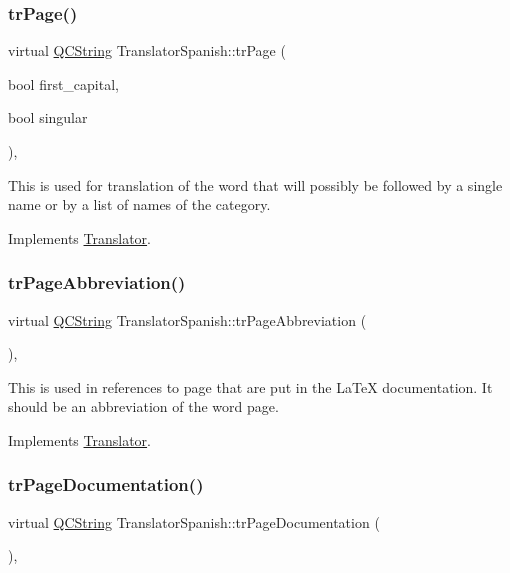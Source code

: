 \subsubsection{\texorpdfstring{trPage()}{trPage()}}
{\footnotesize\ttfamily virtual \mbox{\hyperlink{class_q_c_string}{Q\+C\+String}} Translator\+Spanish\+::tr\+Page (\begin{DoxyParamCaption}\item[{bool}]{first\+\_\+capital,  }\item[{bool}]{singular }\end{DoxyParamCaption})\hspace{0.3cm}{\ttfamily [inline]}, {\ttfamily [virtual]}}

This is used for translation of the word that will possibly be followed by a single name or by a list of names of the category. 

Implements \mbox{\hyperlink{class_translator}{Translator}}.

\mbox{\label{class_translator_spanish_a6fd6a81ee5dab8fdb52086d32010f0ac}} 
\subsubsection{\texorpdfstring{trPageAbbreviation()}{trPageAbbreviation()}}
{\footnotesize\ttfamily virtual \mbox{\hyperlink{class_q_c_string}{Q\+C\+String}} Translator\+Spanish\+::tr\+Page\+Abbreviation (\begin{DoxyParamCaption}{ }\end{DoxyParamCaption})\hspace{0.3cm}{\ttfamily [inline]}, {\ttfamily [virtual]}}

This is used in references to page that are put in the La\+TeX documentation. It should be an abbreviation of the word page. 

Implements \mbox{\hyperlink{class_translator}{Translator}}.

\mbox{\label{class_translator_spanish_af50833c19a7d9fb83375a85fb70309b8}} 
\subsubsection{\texorpdfstring{trPageDocumentation()}{trPageDocumentation()}}
{\footnotesize\ttfamily virtual \mbox{\hyperlink{class_q_c_string}{Q\+C\+String}} Translator\+Spanish\+::tr\+Page\+Documentation (\begin{DoxyParamCaption}{ }\end{DoxyParamCaption})\hspace{0.3cm}{\ttfamily [inline]}, {\ttfamily [virtual]}}

